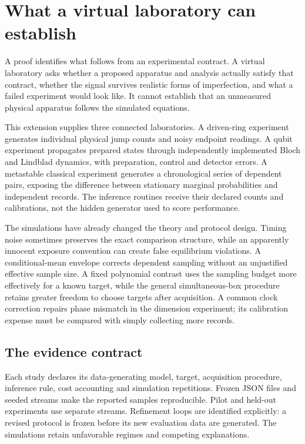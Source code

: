 \chapter{What a virtual laboratory can establish}
\label{vl:entry}

A proof identifies what follows from an experimental contract. A virtual
laboratory asks whether a proposed apparatus and analysis actually satisfy
that contract, whether the signal survives realistic forms of imperfection,
and what a failed experiment would look like. It cannot establish that an
unmeasured physical apparatus follows the simulated equations.

This extension supplies three connected laboratories. A driven-ring experiment
generates individual physical jump counts and noisy endpoint readings. A qubit
experiment propagates prepared states through independently implemented Bloch
and Lindblad dynamics, with preparation, control and detector errors. A
metastable classical experiment generates a chronological series of dependent
pairs, exposing the difference between stationary marginal probabilities and
independent records. The inference routines receive their declared counts and
calibrations, not the hidden generator used to score performance.

The simulations have already changed the theory and protocol design. Timing
noise sometimes preserves the exact comparison structure, while an apparently
innocent exposure convention can create false equilibrium violations. A
conditional-mean envelope corrects dependent sampling without an unjustified
effective sample size. A fixed polynomial contrast uses the sampling budget
more effectively for a known target, while the general simultaneous-box
procedure retains greater freedom to choose targets after acquisition.
A common clock correction repairs phase mismatch in the dimension experiment;
its calibration expense must be compared with simply collecting more records.

\section{The evidence contract}
Each study declares its data-generating model, target, acquisition procedure,
inference rule, cost accounting and simulation repetitions. Frozen JSON files
and seeded streams make the reported samples reproducible. Pilot and held-out
experiments use separate streams. Refinement loops are identified explicitly:
a revised protocol is frozen before its new evaluation data are generated.
The simulations retain unfavorable regimes and competing explanations.

